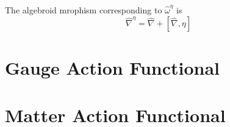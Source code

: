 \begin{proposition}
The algebroid mrophism corresponding to $\hat \omega^\eta$ is 
\begin{equation}
    \hat \nabla^\eta = \hat \nabla + [\hat \nabla, \eta]
\end{equation}
\end{proposition}

\section{Gauge Action Functional}

\section{Matter Action Functional}
